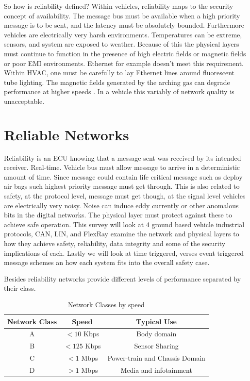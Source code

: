 \documentclass[conference,12pt]{IEEEtran}
\begin{document}
So how is reliability defined? Within vehicles, reliability maps to the
security concept of availability. The message bus must be available when a high
priority message is to be sent, and the latency must be absolutely bounded.
Furthermore vehicles are electrically very harsh environments. Temperatures can
be extreme, sensors, and system are exposed to weather. Because of this the
physical layers must continue to function in the presence of high electric
fields or magnetic fields or poor EMI environments.  Ethernet for example doesn't meet
this requirement. Within HVAC, one must be carefully to lay Ethernet lines around
fluorescent tube lighting. The magnetic fields generated by the
arching gas can degrade performance at higher speeds
\autocite{center_interesting_ethernet}. In a vehicle this
variably of network quality is unacceptable. 


\section{Reliable Networks}
Reliability is an ECU knowing that
a message sent was received by its intended receiver. Real-time. Vehicle bus
must allow message to arrive in a deterministic amount of time. Since message
could contain life critical message such as deploy air bags such highest
priority message must get through. This is also related to safety, at the
protocol level, message must get though, at the signal level vehicles are
electrically very noisy. Noise can induce eddy currently or other anomalous bits
in the digital networks. The physical layer must protect against these to
achieve safe operation.  This survey will look at 4 ground based vehicle
industrial protocols, CAN, LIN, and FlexRay examine the network and
physical layers to how they achieve safety, reliability, data integrity and some
of the security implications of each. Lastly we will look at time triggered,
verses event triggered message schemes an how each system fits into the overall
safety case. 

Besides reliability networks provide different levels of performance separated by
their class.
\begin{table}[!t]
\renewcommand{\arraystretch}{1.3}
\caption{Network Classes by speed}
\label{tbl:network_classes}
\centering
\begin{tabular}{c c c}
\hline
\bfseries Network Class & \bfseries Speed & \bfseries Typical Use \\ \hline
\hline
A & $< 10$ Kbps  & Body domain \\
B & $< 125$ Kbps & Sensor Sharing \\
C & $< 1$ Mbps   & Power-train and Chassis Domain \\
D & $> 1$ Mbps    & Media and infotainment \\
\hline
\end{tabular}
\end{table}
\end{document}
